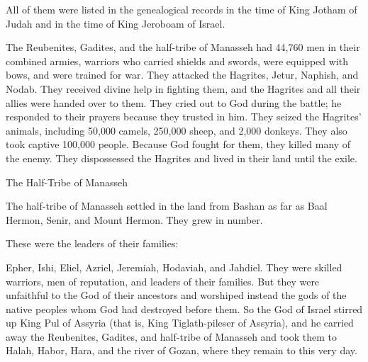 {All
of them were listed in the genealogical records
in the time
of King
Jotham
of Judah
and in the time
of King
Jeroboam
of Israel.
\par }{\PP {}The Reubenites,
Gadites,
and the half-tribe
of Manasseh
had 44,760
men
in their combined armies, warriors
who carried
shields
and swords,
were equipped
with bows,
and were trained
for
war.
They attacked
the Hagrites,
Jetur,
Naphish,
and Nodab.
They received divine help
in fighting them, and the Hagrites
and all
their allies
were handed
over to them. They cried
out to God
during the battle;
he responded to their prayers
because
they trusted in him.
They seized
the Hagrites’ animals,
including 50,000
camels,
250,000
sheep,
and 2,000
donkeys.
They also took captive 100,000
people.
Because
God
fought for them, they killed
many
of the enemy. They dispossessed
the Hagrites
and lived
in their land
until
the exile.
\par }{\SH The Half-Tribe of Manasseh
\par }{\PP {}The half-tribe
of Manasseh
settled
in the land
from Bashan
as far
as Baal Hermon,
Senir,
and Mount
Hermon.
They
grew
in number.
\par }{\PP {}These
were the leaders
of their families:
\par }{\PP Epher,
Ishi,
Eliel,
Azriel,
Jeremiah,
Hodaviah,
and Jahdiel.
They were skilled
warriors,
men
of reputation,
and leaders
of their families.
But they were unfaithful
to the God
of their ancestors
and worshiped
instead the gods
of the native
peoples
whom
God
had destroyed
before them.
So the God
of Israel
stirred
up King
Pul
of Assyria
(that is, King
Tiglath-pileser
of Assyria), and he carried
away the Reubenites,
Gadites,
and half-tribe
of Manasseh
and took them to Halah,
Habor,
Hara,
and the river
of Gozan,
where they remain to this
very day.

}
